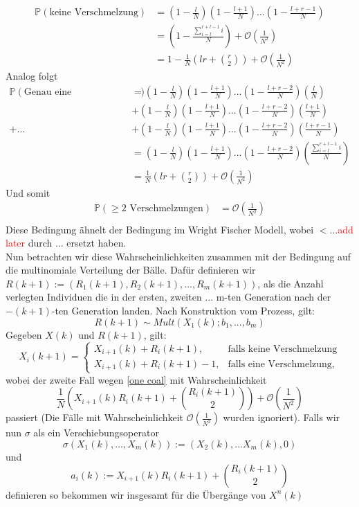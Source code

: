 \begin{align*}
    \mathbb{P}(\text{keine Verschmelzung}) &= (1-\frac{l}{N})(1-\frac{l+1}{N})...(1-\frac{l+r-1}{N}) \\
                                           &= (1 - \frac{\sum_{i=l}^{r+l-1} i}{N}) + \mathcal{O}(\frac{1}{N^2}) \\
                                           &= 1 - \frac{1 }{N}(lr + \binom{r}{2}) + \mathcal{O}(\frac{1}{N^2})
\end{align*}
Analog folgt
\begin{align}
    \mathbb{P}(\text{Genau eine Verschmelzung}) &= (1-\frac{l}{N})(1-\frac{l+1}{N})...(1-\frac{l+r-2}{N})(\frac{l}{N}) \nonumber \\
                                                &+ (1-\frac{l}{N})(1-\frac{l+1}{N})...(1-\frac{l+r-2}{N})(\frac{l+1}{N}) \nonumber \\
                                               + ... &+ (1-\frac{l}{N})(1-\frac{l+1}{N})...(1-\frac{l+r-2}{N})(\frac{l + r -1 }{N}) \nonumber\\
                                                     &= (1-\frac{l}{N})(1-\frac{l+1}{N})...(1-\frac{l+r-2}{N})(\frac{\sum_{i = l}^{r + l -1 }i }{N}) \nonumber\\
                                                     &= \frac{1}{N}(lr + \binom{r}{2}) + \mathcal{O}(\frac{1}{N^2}) \label{one coal}
\end{align}
Und somit 
\begin{align*}
    \mathbb{P}(\geq \text{2 Verschmelzungen}) &= \mathcal{O}(\frac{1}{N^2}) \\
\end{align*}
Diese Bedingung ähnelt der Bedingung im Wright Fischer Modell, wobei $<$...\textcolor{red}{add later} durch ... ersetzt haben. \\
Nun betrachten wir diese Wahrscheinlichkeiten zusammen mit der Bedingung auf die multinomiale Verteilung der Bälle. Dafür definieren wir $R(k+1):= (R_1(k+1),R_2(k+1),...,R_m(k+1))$, als die Anzahl verlegten Individuen die in der ersten, zweiten ... m-ten Generation nach der $-(k+1)$-ten Generation landen. 
Nach Konstruktion vom Prozess, gilt:
\[
    R(k+1) \sim Mult(X_1(k);b_1,...,b_m)
    \]
Gegeben $X(k)$ und $R(k+1)$, gilt:
\begin{equation}
    X_i(k+1) = 
    \begin{cases}
        X_{i+1}(k) + R_i(k+1), &\text{falls keine Verschmelzung}\\
        X_{i+1}(k) + R_i(k+1) - 1, &\text{falls eine Verschmelzung},
    \end{cases}
\end{equation}
wobei der zweite Fall wegen \ref{one coal} mit Wahrscheinlichkeit 
\[
    \frac{1}{N}\left(X_{i+1}(k)R_i(k+1) + \binom{R_i(k+1)}{2}\right) + \mathcal{O}\left(\frac{1}{N^2}\right)
\]
passiert (Die Fälle mit Wahrscheinlichkeit $\mathcal{O}\left(\frac{1}{N^2}\right)$ wurden ignoriert). Falls wir nun $\sigma$ als ein Verschiebungsoperator
\[
    \sigma(X_1(k),...,X_m(k)) := (X_2(k),...X_m(k),0)
\]
und 
\[
    a_i(k) := X_{i+1}(k)R_i(k+1) + \binom{R_i(k+1)}{2}
\]
definieren
so bekommen wir insgesamt für die Übergänge von $X^n(k)$

